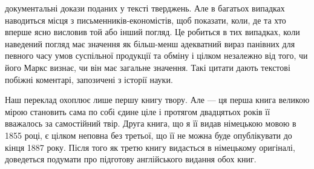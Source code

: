 \parcont{}  %
документальні докази поданих у тексті тверджень. Але в багатьох
випадках наводиться місця з письменників-економістів, щоб показати,
коли, де та хто вперше ясно висловив той або інший
погляд. Це робиться в тих випадках, коли наведений погляд має
значення як більш-менш адекватний вираз панівних для певного
часу умов суспільної продукції та обміну і цілком незалежно від
того, чи його Маркс визнає, чи він має загальне значення. Такі
цитати дають текстові побіжні коментарі, запозичені з історії
науки.

Наш переклад охоплює лише першу книгу твору. Але — ця
перша книга великою мірою становить сама по собі єдине ціле і
протягом двадцятьох років її вважалось за самостійний твір. Друга
книга, що я її видав німецькою мовою в 1855 році, є цілком
неповна без третьої, що її не можна буде опублікувати до кінця
1887 року. Після того як третю книгу видасться в німецькому
оригіналі, доведеться подумати про підготову англійського видання
обох книг.

